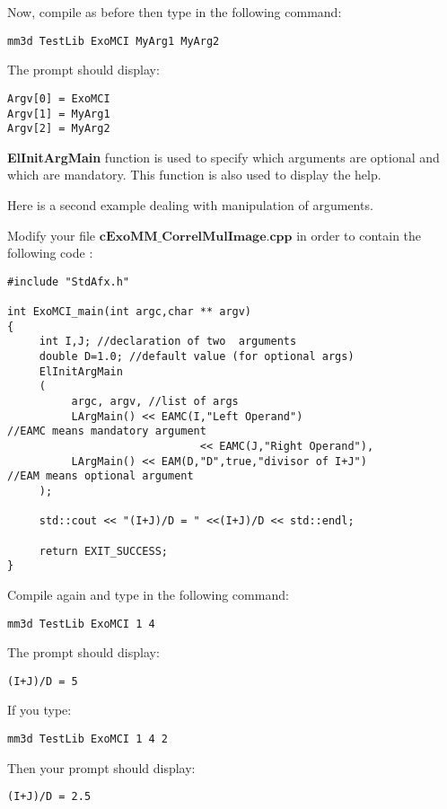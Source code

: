 Now, compile as before then type in the following command: 
\begin{verbatim}
mm3d TestLib ExoMCI MyArg1 MyArg2
\end{verbatim}

The prompt should display:\newline

\begin{verbatim}
Argv[0] = ExoMCI 
Argv[1] = MyArg1 
Argv[2] = MyArg2
\end{verbatim}

\textbf{ElInitArgMain} function is used to specify which arguments are optional and which are mandatory. This function is also used to display the help. \newline

Here is a second example dealing with manipulation of arguments.\newline

Modify your file $\textbf{cExoMM\_CorrelMulImage.cpp}$ in order to contain the following code :

\begin{verbatim}
#include "StdAfx.h" 

int ExoMCI_main(int argc,char ** argv) 
{ 
     int I,J; //declaration of two  arguments 
     double D=1.0; //default value (for optional args)
     ElInitArgMain 
     ( 
          argc, argv, //list of args 
          LArgMain() << EAMC(I,"Left Operand") 
//EAMC means mandatory argument 
                              << EAMC(J,"Right Operand"),    	
          LArgMain() << EAM(D,"D",true,"divisor of I+J") 
//EAM means optional argument 
     ); 
     
     std::cout << "(I+J)/D = " <<(I+J)/D << std::endl;
     
     return EXIT_SUCCESS; 
}
\end{verbatim}

Compile again and type in the following command:
\begin{verbatim}
mm3d TestLib ExoMCI 1 4
\end{verbatim}

The prompt should display:
\begin{verbatim}
(I+J)/D = 5
\end{verbatim}

If you type:
\begin{verbatim}
mm3d TestLib ExoMCI 1 4 2
\end{verbatim} 

Then your prompt should display:
\begin{verbatim}
(I+J)/D = 2.5
\end{verbatim}
